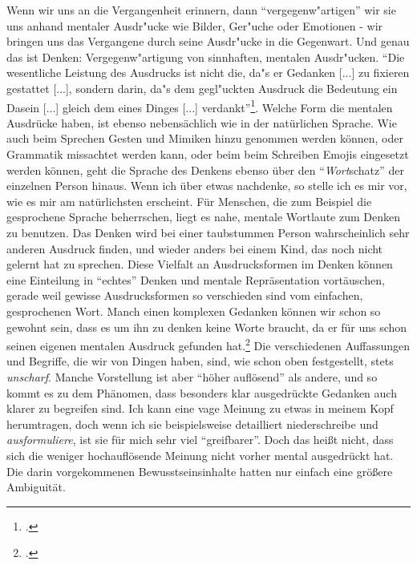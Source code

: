\documentclass[a4paper, 12pt]{article}
\begin{document}
\begin{onehalfspace}
Wenn wir uns an die Vergangenheit erinnern, dann "`vergegenw"artigen"' wir sie uns anhand mentaler Ausdr"ucke wie Bilder, Ger"uche oder Emotionen - wir bringen uns das Vergangene durch seine Ausdr"ucke in die Gegenwart. Und genau das ist Denken: Vergegenw"artigung von sinnhaften, mentalen Ausdr"ucken. "`Die wesentliche Leistung des Ausdrucks ist nicht die, da"s er Gedanken [...] zu fixieren gestattet [...], sondern darin, da"s dem gegl"uckten Ausdruck die Bedeutung ein Dasein [...] gleich dem eines Dinges [...] verdankt"'\footnote{\Cite[Siehe][S. 216]{merleau1966phanomenologie}.}. Welche Form die mentalen Ausdrücke haben, ist ebenso nebensächlich wie in der natürlichen Sprache. Wie auch beim Sprechen Gesten und Mimiken hinzu genommen werden können, oder Grammatik missachtet werden kann, oder beim beim Schreiben Emojis eingesetzt werden können, geht die Sprache des Denkens ebenso über den "`\emph{Wort}schatz"' der einzelnen Person hinaus. Wenn ich über etwas nachdenke, so stelle ich es mir vor, wie es mir am natürlichsten erscheint. Für Menschen, die zum Beispiel die gesprochene Sprache beherrschen, liegt es nahe, mentale Wortlaute zum Denken zu benutzen. Das Denken wird bei einer taubstummen Person wahrscheinlich sehr anderen Ausdruck finden, und wieder anders bei einem Kind, das noch nicht gelernt hat zu sprechen. Diese Vielfalt an Ausdrucksformen im Denken können eine Einteilung in "`echtes"' Denken und mentale Repräsentation vortäuschen, gerade weil gewisse Ausdrucksformen so verschieden sind vom einfachen, gesprochenen Wort. Manch einen komplexen Gedanken können wir schon so gewohnt sein, dass es um ihn zu denken keine Worte braucht, da er für uns schon seinen eigenen mentalen Ausdruck gefunden hat.\footnote{\Cite[Vgl.][S. 217]{merleau1966phanomenologie}.} Die verschiedenen Auffassungen und Begriffe, die wir von Dingen haben, sind, wie schon oben festgestellt, stets \emph{unscharf}. Manche Vorstellung ist aber "`höher auflösend"' als andere, und so kommt es zu dem Phänomen, dass besonders klar ausgedrückte Gedanken auch klarer zu begreifen sind. Ich kann eine vage Meinung zu etwas in meinem Kopf herumtragen, doch wenn ich sie beispielsweise detailliert niederschreibe und \emph{ausformuliere}, ist sie für mich sehr viel "`greifbarer"'. Doch das heißt nicht, dass sich die weniger hochauflösende Meinung nicht vorher mental ausgedrückt hat. Die darin vorgekommenen Bewusstseinsinhalte hatten nur einfach eine größere Ambiguität.

\vspace{5mm}


\end{onehalfspace}
\end{document}
